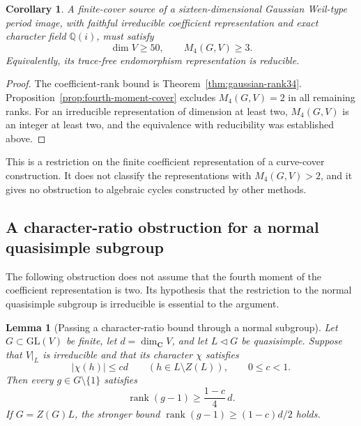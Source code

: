 \documentclass[11pt]{article}
\newtheorem{lemma}[theorem]{Lemma}
\newtheorem{corollary}[theorem]{Corollary}
\theoremstyle{definition}
\theoremstyle{remark}
\begin{document}
\begin{corollary}\label{cor:gaussian-reducible-endomorphisms}
A finite-cover source of a sixteen-dimensional Gaussian Weil-type
period image, with faithful irreducible coefficient representation and
exact character field $\mathbb Q(i)$, must satisfy
\[
 \dim V\ge50,\qquad
 M_4(G,V)\ge3.
\]
Equivalently, its trace-free endomorphism representation is reducible.
\end{corollary}

\begin{proof}
The coefficient-rank bound is
Theorem~\ref{thm:gaussian-rank34}.  Proposition~\ref{prop:fourth-moment-cover}
excludes $M_4(G,V)=2$ in all remaining ranks.  For an irreducible
representation of dimension at least two, $M_4(G,V)$ is an integer at
least two, and the equivalence with reducibility was established above.
\end{proof}

This is a restriction on the finite coefficient representation of a
curve-cover construction.  It does not classify the representations
with $M_4(G,V)>2$, and it gives no obstruction to algebraic cycles
constructed by other methods.

\subsection{A character-ratio obstruction for a normal quasisimple subgroup}
\label{subsec:quasisimple-character-ratios}

The following obstruction does not assume that the fourth moment of the
coefficient representation is two.  Its hypothesis that the restriction
to the normal quasisimple subgroup is irreducible is essential to the
argument.

\begin{lemma}[Passing a character-ratio bound through a normal subgroup]
\label{lem:normal-quasisimple-support}
Let $G\subset\mathrm{GL}(V)$ be finite, let $d=\dim_{\mathbf C}V$, and
let $L\triangleleft G$ be quasisimple.  Suppose that $V|_L$ is irreducible
and that its character $\chi$ satisfies
\[
 |\chi(h)|\le c d\qquad(h\in L\setminus Z(L)),\qquad 0\le c<1.
\]
Then every $g\in G\setminus\{1\}$ satisfies
\[
 \operatorname{rank}(g-1)\ge \frac{1-c}{4}\,d.
\]
If $G=Z(G)L$, the stronger bound
$\operatorname{rank}(g-1)\ge (1-c)d/2$ holds.
\end{lemma}
\end{document}
